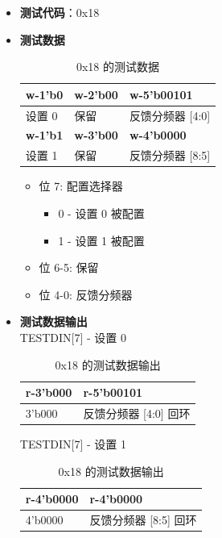 \documentclass[main\_\_CN.tex]{subfiles}
\begin{document}
\begin{itemize}
    \item \textbf{测试代码}：0x18
    \item \textbf{测试数据}
        \begin{longtable}{ |p{4cm}|p{4cm}|p{4cm}|}
            \caption{0x18 的测试数据}
            \label{tab:test-data-0x18} \\
            \hline
            \rowcolor{lightgray}
            \textbf{w-1'b0} & \textbf{w-2'b00} & \textbf{w-5'b00101} \\ \hline
            设置 0 & 保留 & 反馈分频器 [4:0]  \\ \hline
            \rowcolor{lightgray}
            \textbf{w-1'b1} & \textbf{w-3'b00} & \textbf{w-4'b0000} \\ \hline
            设置 1 & 保留 & 反馈分频器 [8:5]  \\ \hline
        \end{longtable}
        \begin{itemize}
            \item 位 7: 配置选择器
                \begin{itemize}
                    \item 0 - 设置 0 被配置
                    \item 1 - 设置 1 被配置
                \end{itemize}
            \item 位 6-5: 保留
            \item 位 4-0: 反馈分频器
        \end{itemize}
    \item \textbf{测试数据输出}\\
        TESTDIN[7] - 设置 0
        \begin{longtable}{ |p{4cm}|p{8cm}|}
            \caption{0x18 的测试数据输出}
            \label{tab:test-dout-0x18-set0} \\
            \hline
            \rowcolor{lightgray}
            \textbf{r-3'b000} & \textbf{r-5'b00101} \\ \hline
            3'b000 & 反馈分频器 [4:0] 回环 \\ \hline
        \end{longtable}
        TESTDIN[7] - 设置 1
        \begin{longtable}{ |p{4cm}|p{8cm}|}
            \caption{0x18 的测试数据输出}
            \label{tab:test-dout-0x18-set1} \\
            \hline
            \rowcolor{lightgray}
            \textbf{r-4'b0000} & \textbf{r-4'b0000} \\ \hline
            4'b0000 & 反馈分频器 [8:5] 回环 \\ \hline
        \end{longtable}
\end{itemize}
\end{document}
